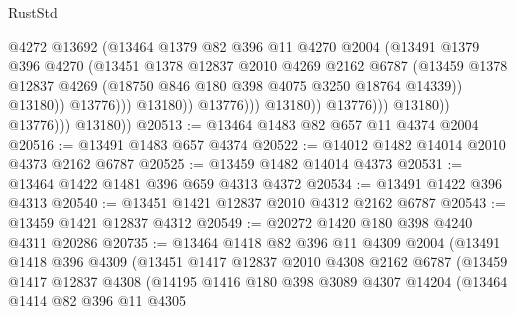 \begin{lexlean}{RustStd}
\begin{coremodule}
{\begin{coremodule}
{{{{{{{{{{{{{{{{{{{{{{{{{{{{{{{                                          @4272
                                          @13692
                                          (@13464
                                            @1379
                                            @82
                                            @396
                                            @11
                                            @4270
                                            @2004
                                            (@13491
                                              @1379
                                              @396
                                              @4270
                                              (@13451
                                                @1378
                                                @12837
                                                @2010
                                                @4269
                                                @2162
                                                @6787
                                                (@13459
                                                  @1378
                                                  @12837
                                                  @4269
                                                  (@18750 @846 @180 @398 @4075 @3250 @18764 @14339))
                                                @13180))
                                            @13776)))
                                      @13180))
                                  @13776)))
                            @13180))
                        @13776)))
                  @13180))
              @13776)))
        @13180))
@20513 := @13464 @1483 @82 @657 @11 @4374 @2004
@20516 := @13491 @1483 @657 @4374
@20522 := @14012 @1482 @14014 @2010 @4373 @2162 @6787
@20525 := @13459 @1482 @14014 @4373
@20531 := @13464 @1422 @1481 @396 @659 @4313 @4372
@20534 := @13491 @1422 @396 @4313
@20540 := @13451 @1421 @12837 @2010 @4312 @2162 @6787
@20543 := @13459 @1421 @12837 @4312
@20549 := @20272 @1420 @180 @398 @4240 @4311 @20286
@20735 := @13464
    @1418
    @82
    @396
    @11
    @4309
    @2004
    (@13491
      @1418
      @396
      @4309
      (@13451
        @1417
        @12837
        @2010
        @4308
        @2162
        @6787
        (@13459
          @1417
          @12837
          @4308
          (@14195
            @1416
            @180
            @398
            @3089
            @4307
            @14204
            (@13464
              @1414
              @82
              @396
              @11
              @4305
}}}}}}}}}}}}}}}}}}}}}}}}}}}}}}}
\end{coremodule}}
\end{coremodule}
\end{lexlean}
